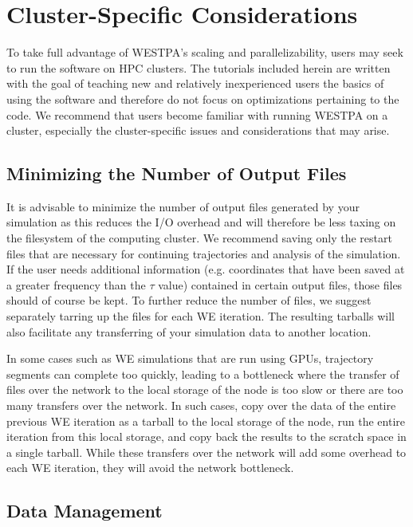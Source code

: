 \section{Cluster-Specific Considerations}

To take full advantage of WESTPA’s scaling and parallelizability, users may seek to run the software on HPC clusters.
The tutorials included herein are written with the goal of teaching new and relatively inexperienced users the basics of using the software and therefore do not focus on optimizations pertaining to the code. 
We recommend that users become familiar with running WESTPA on a cluster, especially the cluster-specific issues and considerations that may arise.

\subsection{Minimizing the Number of Output Files}
\label{intro:minimizing_traffic}
It is advisable to minimize the number of output files generated by your simulation as this reduces the I/O overhead and will therefore be less taxing on the filesystem of the computing cluster. 
We recommend saving only the restart files that are necessary for continuing trajectories and analysis of the simulation. 
If the user needs additional information (e.g. coordinates that have been saved at a greater frequency than the $\tau$ value) contained in certain output files, those files should of course be kept. 
To further reduce the number of files, we suggest separately tarring up the files for each WE iteration. 
The resulting tarballs will also facilitate any transferring of your simulation data to another location. 

In some cases such as WE simulations that are run using GPUs, trajectory segments can complete too quickly, leading to a bottleneck where the transfer of files over the network to the local storage of the node is too slow or there are too many transfers over the network. 
In such cases, copy over the data of the entire previous WE iteration as a tarball  to the local storage of the node, run the entire iteration from this local storage, and copy back the results to the scratch space in a single tarball. 
While these transfers over the network will add some overhead to each WE iteration, they will avoid the network bottleneck. 

\subsection{Data Management}

